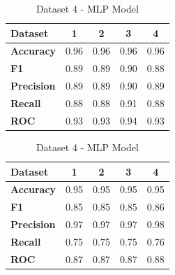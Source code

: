 \begin{table}[H]
\begin{subtable}[H]{0.45\textwidth}
\begin{tabular}{|l|c|c|c|c|}
      \hline
      \textbf{Dataset}   & \textbf{1} & \textbf{2} & \textbf{3} & \textbf{4} \\
      \hline
      \textbf{Accuracy}  & 0.96       & 0.96       & 0.96       & 0.96       \\
      \textbf{F1}        & 0.89       & 0.89       & 0.90       & 0.88       \\
      \textbf{Precision} & 0.89       & 0.89       & 0.90       & 0.89       \\
      \textbf{Recall}    & 0.88       & 0.88       & 0.91       & 0.88       \\
      \textbf{ROC}       & 0.93       & 0.93       & 0.94       & 0.93       \\
      \hline
    \end{tabular}
    \caption{Dataset 3 - MLP Model}\label{subtab:dataset_3_mlp_model}
  \end{subtable}
  \quad
  \begin{subtable}[H]{0.45\textwidth}
    \centering
    \begin{tabular}{|l|c|c|c|c|}
      \hline
      \textbf{Dataset}   & \textbf{1} & \textbf{2} & \textbf{3} & \textbf{4} \\
      \hline
      \textbf{Accuracy}  & 0.95       & 0.95       & 0.95       & 0.95       \\
      \textbf{F1}        & 0.85       & 0.85       & 0.85       & 0.86       \\
      \textbf{Precision} & 0.97       & 0.97       & 0.97       & 0.98       \\
      \textbf{Recall}    & 0.75       & 0.75       & 0.75       & 0.76       \\
      \textbf{ROC}       & 0.87       & 0.87       & 0.87       & 0.88       \\
      \hline
    \end{tabular}
    \caption{Dataset 4 - MLP Model}\label{subtab:dataset_4_mlp_model}
  \end{subtable}
\end{table}

